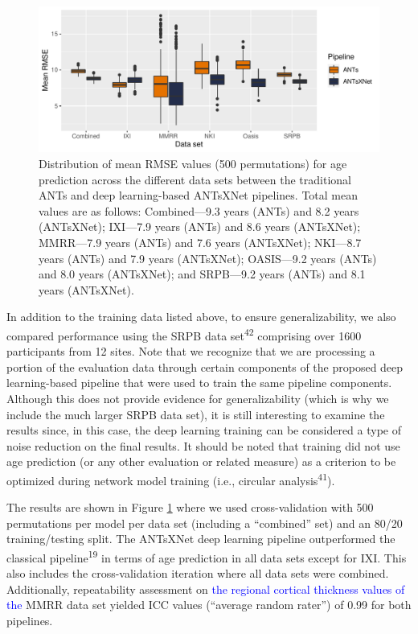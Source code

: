 \documentclass[12pt,]{article}
\begin{document}
\begin{figure}[htb]
  \centering
    \includegraphics[width=\textwidth]{Figures/rmseThicknessPerSite.pdf}
  \caption{Distribution of mean RMSE values (500 permutations) for age
          prediction across the different data sets between
          the traditional ANTs and deep learning-based ANTsXNet pipelines. Total
          mean values are as follows: Combined---9.3 years (ANTs) and 8.2 years
          (ANTsXNet); IXI---7.9 years (ANTs) and 8.6 years (ANTsXNet);
          MMRR---7.9 years (ANTs) and 7.6 years (ANTsXNet); NKI---8.7 years
          (ANTs) and 7.9 years (ANTsXNet); OASIS---9.2 years (ANTs) and 8.0
          years (ANTsXNet); and SRPB---9.2 years (ANTs) and 8.1 years
          (ANTsXNet).}
  \label{fig:agePrediction}
\end{figure}

In addition to the training data listed above, to ensure
generalizability, we also compared performance using the SRPB data
set\textsuperscript{42} comprising over 1600 participants from 12 sites.
Note that we recognize that we are processing a portion of the
evaluation data through certain components of the proposed deep
learning-based pipeline that were used to train the same pipeline
components. Although this does not provide evidence for generalizability
(which is why we include the much larger SRPB data set), it is still
interesting to examine the results since, in this case, the deep
learning training can be considered a type of noise reduction on the
final results. It should be noted that training did not use age
prediction (or any other evaluation or related measure) as a criterion
to be optimized during network model training (i.e., circular
analysis\textsuperscript{41}).

The results are shown in Figure \ref{fig:agePrediction} where we used
cross-validation with 500 permutations per model per data set (including
a ``combined'' set) and an 80/20 training/testing split. The ANTsXNet
deep learning pipeline outperformed the classical
pipeline\textsuperscript{19} in terms of age prediction in all data sets
except for IXI. This also includes the cross-validation iteration where
all data sets were combined. Additionally, repeatability assessment on
\textcolor{blue}{the regional cortical thickness
values of the} MMRR data set yielded ICC values (``average random
rater'') of 0.99 for both pipelines.
\end{document}
